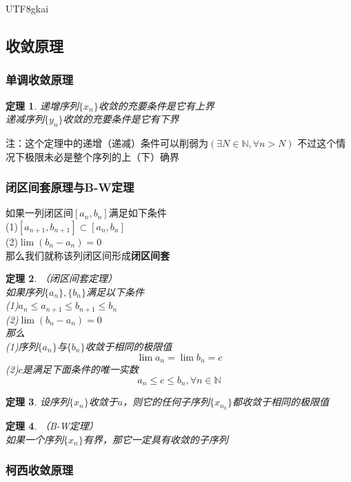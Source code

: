 \documentclass{article}
\newtheorem{theorem}{定理}[subsection]
\begin{document}
\begin{CJK}{UTF8}{gkai}
\subsection{收敛原理}
\subsubsection{单调收敛原理}
\begin{theorem}
递增序列$\{x_n\}$收敛的充要条件是它有上界\\

递减序列$\{y_n\}$收敛的充要条件是它有下界\\
\end{theorem}
注：这个定理中的递增（递减）条件可以削弱为$(\exists N\in \mathbb{N},\forall n > N)$
不过这个情况下极限未必是整个序列的上（下）确界\\
\subsubsection{闭区间套原理与B-W定理}
如果一列闭区间$[a_n,b_n]$满足如下条件\\
(1)$[ a_{n+1},b_{n+1}]\subset[ a_n,b_n]$\\
(2)$\lim(b_n-a_n)=0$\\
那么我们就称该列闭区间形成\textbf{闭区间套}\\
\begin{theorem}（闭区间套定理）\\

如果序列$\{a_n\},\{b_n\}$满足以下条件\\

(1)$a_n\leq a_{n+1}\leq b_{n+1}\leq b_n$\\

(2)$\lim(b_n-a_n)=0$\\

那么\\

(1)序列$\{a_n\}$与$\{b_n\}$收敛于相同的极限值
\[\lim a_n=\lim b_n=c\]
(2)$c$是满足下面条件的唯一实数
\[a_n\leq c\leq b_n,\forall n\in \mathbb{N}\]
\end{theorem}
\begin{theorem}
设序列$\{x_n\}$收敛于$a$，则它的任何子序列$\{x_{n_k}\}$都收敛于相同的极限值\\
\end{theorem}
\begin{theorem}（B-W定理）\\
如果一个序列$\{x_n\}$有界，那它一定具有收敛的子序列\\
\subsubsection{柯西收敛原理}
\end{theorem}

\end{CJK}
\end{document}
